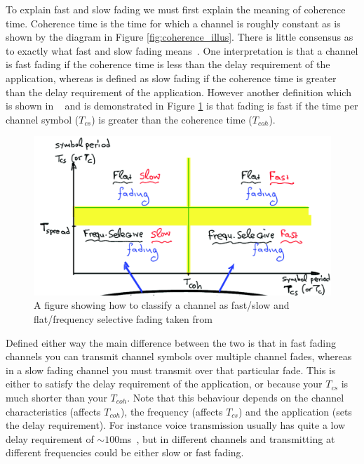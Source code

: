 \documentclass[12pt,onecolumn,letterpaper]{article}
\begin{document}
To explain fast and slow fading we must first explain the meaning of coherence time. Coherence time is the time for which a channel is roughly constant as is shown by the diagram in Figure \ref{fig:coherence_illus}. There is little consensus as to exactly what fast and slow fading means~\cite{WirelessTextbookC2}. One interpretation is that a channel is fast fading if the coherence time is less than the delay requirement of the application, whereas is defined as slow fading if the coherence time is greater than the delay requirement of the application. However another definition which is shown in ~\cite{EE3CommsSystemsNotesL4} and is demonstrated in Figure \ref{fig:fast_slow_flat_freq_selec_fading} is that fading is fast if the time per channel symbol ($T_{cs}$) is greater than the coherence time ($T_{coh}$).

\begin{figure}[t]
\begin{center}
   \includegraphics[width=0.8\linewidth]{figures/fast_slow_flat_freq_selec_fading.PNG}
\end{center}
   \caption{A figure showing how to classify a channel as fast/slow and flat/frequency selective fading taken from~\cite{EE3CommsSystemsNotesL4}}
\label{fig:fast_slow_flat_freq_selec_fading}
\end{figure}

Defined either way the main difference between the two is that in fast fading channels you can transmit channel symbols over multiple channel fades, whereas in a slow fading channel you must transmit over that particular fade. This is either to satisfy the delay requirement of the application, or because your $T_{cs}$ is much shorter than your $T_{coh}$. Note that this behaviour depends on the channel characteristics (affects $T_{coh}$), the frequency (affects $T_{cs}$) and the application (sets the delay requirement). For instance voice transmission usually has quite a low delay requirement of ${\sim}100$ms~\cite{WirelessTextbookC2}, but in different channels and transmitting at different frequencies could be either slow or fast fading.
\end{document}
